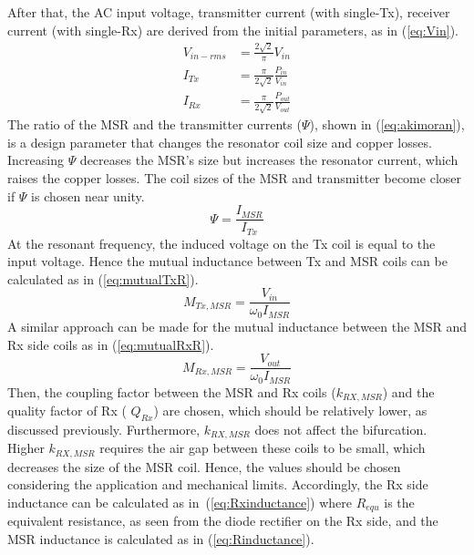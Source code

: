 \documentclass[journal]{IEEEtran}
\begin{document}
After that, the AC input voltage, transmitter current (with single-Tx), receiver current (with single-Rx) are derived from the initial parameters, as in (\ref{eq:Vin}).
\begin{equation}
\label{eq:Vin}
    \begin{split}
  V_{in-rms}&=\frac{2\sqrt2}{\pi}V_{in}\\
  I_{Tx}&=\frac{\pi}{2\sqrt2}\frac{ P_{in}}{V_{in}} \\
  I_{Rx}&=\frac{\pi}{2\sqrt2}\frac{ P_{out}}{V_{out}} 
  \end{split}
  \end{equation}
The ratio of the MSR and the transmitter currents ($\Psi$), shown in (\ref{eq:akimoran}), is a design parameter that changes the resonator coil size and copper losses. 
Increasing $\Psi$ decreases the MSR's size but increases the resonator current, which raises the copper losses. 
The coil sizes of the MSR and transmitter become closer if $\Psi$ is chosen near unity. 
\begin{equation}
\Psi=\frac{I_{MSR}}{I_{Tx}}
    \label{eq:akimoran}
\end{equation}
At the resonant frequency, the induced voltage on the Tx coil is equal to the input voltage. Hence the mutual inductance between Tx and MSR coils can be calculated as in (\ref{eq:mutualTxR}).
\begin{equation}
M_{Tx,MSR}=\frac{V_{in}}{\omega_{0}I_{MSR}}
    \label{eq:mutualTxR}
\end{equation}
A similar approach can be made for the mutual inductance between the MSR and Rx side coils as in (\ref{eq:mutualRxR}).
 \begin{equation}
M_{Rx,MSR}=\frac{V_{out}}{\omega_{0}I_{MSR}}
    \label{eq:mutualRxR}
\end{equation}
Then,  the coupling factor between the MSR and Rx coils ($k_{RX,MSR}$) and the quality factor of Rx ( $Q_{Rx}$) are chosen, which should be relatively lower, as discussed previously. 
Furthermore, $k_{RX,MSR}$ does not affect the bifurcation. 
Higher $k_{RX,MSR}$ requires the air gap between these coils to be small, which decreases the size of the MSR coil. 
Hence, the values should be chosen considering the application and mechanical limits. 
Accordingly, the Rx side inductance can be calculated as in~(\ref{eq:Rxinductance}) where $R_{equ}$ is the equivalent resistance, as seen from the diode rectifier on the Rx side, and the MSR inductance is calculated as in (\ref{eq:Rinductance}).
\end{document}
